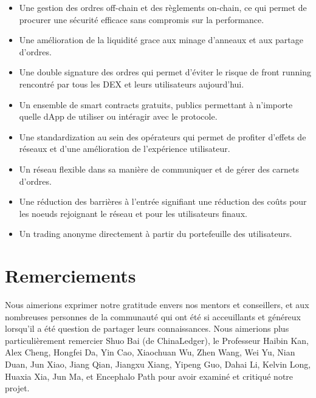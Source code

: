 \documentclass[UTF8,nofonts]{article}
\begin{document}
\begin{multicols}{2}
\begin{itemize}
	\item Une gestion des ordres off-chain et des règlements on-chain, ce qui permet de procurer une sécurité efficace sans compromis sur la performance.
	\item Une amélioration de la liquidité grace aux minage d'anneaux et aux partage d'ordres.
	\item Une double signature des ordres qui permet d'éviter le risque de front running rencontré par tous les DEX et leurs utilisateurs aujourd'hui.
	\item Un ensemble de smart contracts gratuits, publics permettant à n'importe quelle dApp de utiliser ou intéragir avec le protocole.
	\item Une standardization au sein des opérateurs qui permet de profiter d'effets de réseaux et d'une amélioration de l'expérience utilisateur.
	\item Un réseau flexible dans sa manière de communiquer et de gérer des carnets d'ordres.
	\item Une réduction des barrières à l'entrée signifiant une réduction des coûts pour les noeuds rejoignant le réseau et pour les utilisateurs finaux.
	\item Un trading anonyme directement à partir du portefeuille des utilisateurs.
\end{itemize}

\section{Remerciements}
Nous aimerions exprimer notre gratitude envers nos mentors et conseillers, et aux nombreuses personnes de la communauté qui ont été si acceuillants et généreux lorsqu'il a été question de partager leurs connaissances. Nous aimerions plus particulièrement remercier Shuo Bai (de ChinaLedger), le Professeur Haibin Kan, Alex Cheng, Hongfei Da, Yin Cao, Xiaochuan Wu, Zhen Wang, Wei Yu, Nian Duan, Jun Xiao, Jiang Qian, Jiangxu Xiang, Yipeng Guo, Dahai Li, Kelvin Long, Huaxia Xia, Jun Ma, et Encephalo Path pour avoir examiné et critiqué notre projet.  






\end{multicols}
\end{document}
